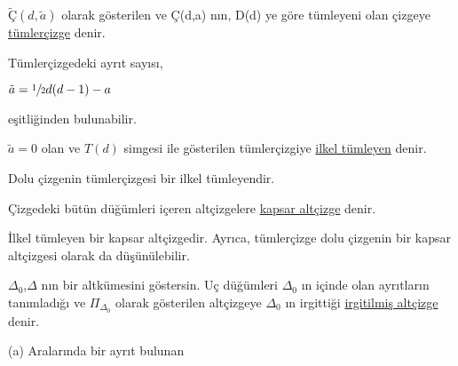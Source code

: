 \documentclass{article}
\begin{document}
    \begin{definition}
        $\tilde{Ç}(d,\tilde{a})$ olarak gösterilen ve Ç(d,a) nın, D(d) ye göre tümleyeni olan çizgeye \underline{tümlerçizge} denir.\\
    \end{definition}
    Tümlerçizgedeki ayrıt sayısı,
    \begin{center}
        $\tilde{a}=\sfrac{1}{2}d(d-1)-a$\\
    \end{center}
    eşitliğinden bulunabilir.\\
    
    \begin{definition}
        $\tilde{a}=0$ olan ve $T(d)$ simgesi ile gösterilen tümlerçizgiye \underline{ilkel tümleyen} denir.\\
    \end{definition}
    
    Dolu çizgenin tümlerçizgesi bir ilkel tümleyendir.\\
    
    \begin{definition}
        Çizgedeki bütün düğümleri içeren altçizgelere \underline{kapsar altçizge} denir.\\
    \end{definition}
    
    İlkel tümleyen bir kapsar altçizgedir. Ayrıca, tümlerçizge dolu çizgenin bir kapsar altçizgesi olarak da düşünülebilir.\\
    
    \begin{definition}
        $\Delta_{0}$,$\Delta$ nın bir altkümesini göstersin. Uç düğümleri $\Delta_{0}$ ın içinde olan ayrıtların tanımladığı ve ${\Pi}_{\Delta_{0}}$ olarak gösterilen altçizgeye $\Delta_{0}$ ın irgittiği \underline{irgitilmiş altçizge} denir.\\
    \end{definition}
    \begin{definition}
        (a) Aralarında bir ayrıt bulunan
    \end{definition}
\end{document}
